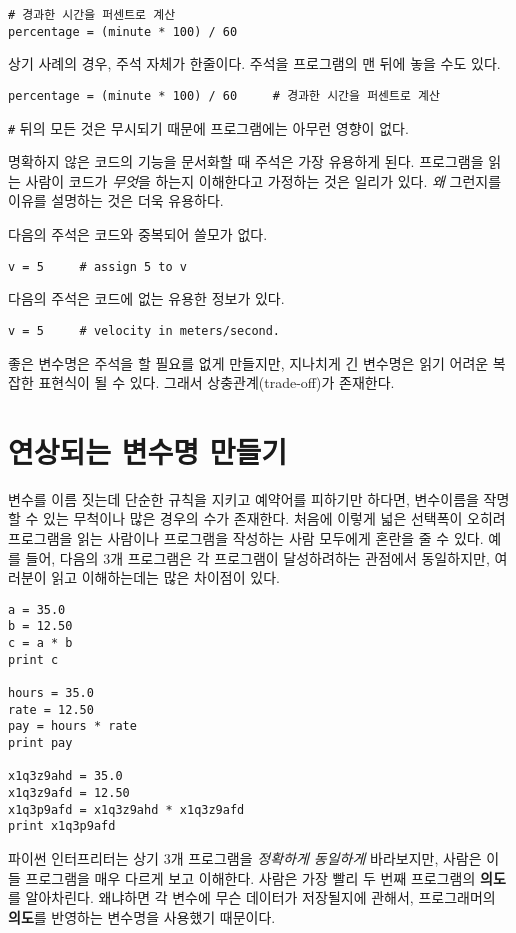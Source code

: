 \beforeverb
\begin{verbatim}
# 경과한 시간을 퍼센트로 계산
percentage = (minute * 100) / 60
\end{verbatim}
\afterverb
%
상기 사례의 경우, 주석 자체가 한줄이다. 주석을 프로그램의 맨 뒤에 놓을 수도 있다.

\beforeverb
\begin{verbatim}
percentage = (minute * 100) / 60     # 경과한 시간을 퍼센트로 계산
\end{verbatim}
\afterverb
%

{\tt \#} 뒤의 모든 것은 무시되기 때문에 프로그램에는 아무런 영향이 없다.

명확하지 않은 코드의 기능을 문서화할 때 주석은 가장 유용하게 된다.
프로그램을 읽는 사람이 코드가 \emph{무엇}을 하는지 이해한다고 가정하는 것은 일리가 있다.
\emph{왜} 그런지를 이유를 설명하는 것은 더욱 유용하다.

다음의 주석은 코드와 중복되어 쓸모가 없다.

\beforeverb
\begin{verbatim}
v = 5     # assign 5 to v
\end{verbatim}
\afterverb
%

다음의 주석은 코드에 없는 유용한 정보가 있다.

\beforeverb
\begin{verbatim}
v = 5     # velocity in meters/second. 
\end{verbatim}
\afterverb
%
좋은 변수명은 주석을 할 필요를 없게 만들지만, 지나치게 긴 변수명은 읽기 어려운 복잡한 표현식이 될 수 있다. 그래서 상충관계(trade-off)가 존재한다.

\section{연상되는 변수명 만들기}


변수를 이름 짓는데 단순한 규칙을 지키고 예약어를 피하기만 하다면, 변수이름을 작명할 수 있는 무척이나 많은 경우의 수가 존재한다. 
처음에 이렇게 넓은 선택폭이 오히려 프로그램을 읽는 사람이나 프로그램을 작성하는 사람 모두에게 혼란을 줄 수 있다. 
예를 들어, 다음의 3개 프로그램은 각 프로그램이 달성하려하는 관점에서 동일하지만, 여러분이 읽고 이해하는데는 많은 차이점이 있다.

\beforeverb
\begin{verbatim}
a = 35.0
b = 12.50
c = a * b
print c

hours = 35.0
rate = 12.50
pay = hours * rate
print pay

x1q3z9ahd = 35.0
x1q3z9afd = 12.50
x1q3p9afd = x1q3z9ahd * x1q3z9afd
print x1q3p9afd
\end{verbatim}
\afterverb
%
파이썬 인터프리터는 상기 3개 프로그램을 \emph{정확하게 동일하게} 바라보지만, 
사람은 이들 프로그램을 매우 다르게 보고 이해한다. 
사람은 가장 빨리 두 번째 프로그램의 {\bf 의도}를 알아차린다. 
왜냐하면 각 변수에 무슨 데이터가 저장될지에 관해서, 프로그래머의 {\bf 의도}를 반영하는 변수명을 사용했기 때문이다.

